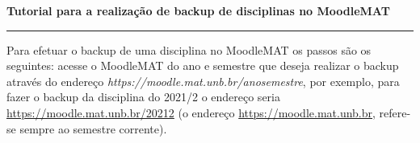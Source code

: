 \documentclass[12pt]{report}
\begin{document}
\begin{center}
{\Large \textbf{Tutorial para a realiza\c{c}\~ao de backup de disciplinas no MoodleMAT}}
\end{center}
\vspace{.3cm}
\hrule

\vspace{.7cm}

Para efetuar o backup de uma disciplina no MoodleMAT os passos s\~ao os seguintes: acesse o MoodleMAT do ano e semestre que deseja realizar o backup atrav\'es do endere\c{c}o \textit{https://moodle.mat.unb.br/anosemestre}, por exemplo, para fazer o backup da disciplina do 2021/2 o endere\c{c}o seria \href{https://moodle.mat.unb.br/20212}{https://moodle.mat.unb.br/20212} (o endere\c{c}o \href{https://moodle.mat.unb.br}{https://moodle.mat.unb.br}, refere-se sempre ao semestre corrente).
\end{document}
